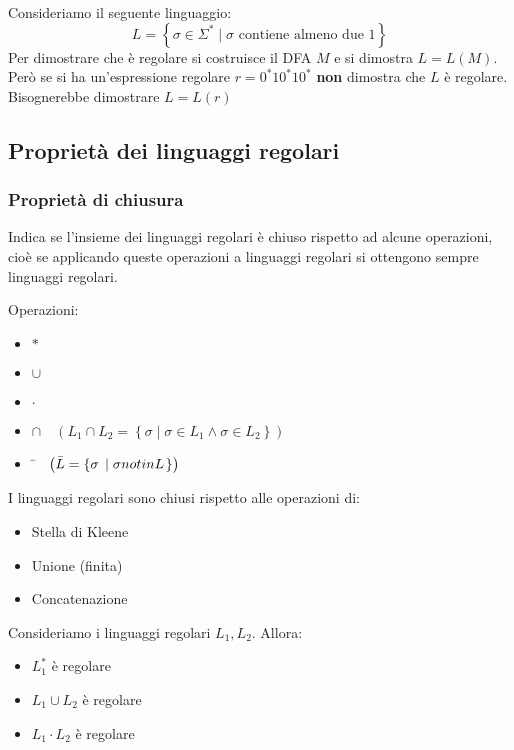 \documentclass[a4paper]{article}
\begin{document}
\begin{example}
  Consideriamo il seguente linguaggio:
  \[
    L = \left\{ \sigma \in \Sigma^* \;\left|\; \sigma \text{ contiene almeno due } 1 \right. \right\}
  \] 
  Per dimostrare che è regolare si costruisce il DFA \( M \) e si dimostra \( L = L(M) \).
  Però se si ha un'espressione regolare \( r = 0^*1 0^*1 0^* \) \textbf{non} dimostra
  che \( L \) è regolare. Bisognerebbe dimostrare \( L = L(r) \) 
\end{example}

\subsection{Proprietà dei linguaggi regolari}

\subsubsection{Proprietà di chiusura}
Indica se l'insieme dei linguaggi regolari è chiuso rispetto ad alcune operazioni,
cioè se applicando queste operazioni a linguaggi regolari si ottengono sempre
linguaggi regolari.

Operazioni:
\begin{itemize}
  \item \( * \) 
  \item \( \cup \) 
  \item \( \cdot  \) 
\item \( \cap \quad \left(L_1 \cap L_2 = \left\{ \sigma \;\left|\; \sigma \in L_1 \wedge \sigma \in L_2 \right. \right\}\right) \)
\item \( \bar{} \quad \left(\bar{L} = \left\{ \sigma \;\left|\; \sigma \\notin L \right. \right\}\right) \)
\end{itemize}

\begin{theorem}
  I linguaggi regolari sono chiusi rispetto alle operazioni di:
  \begin{itemize}
    \item Stella di Kleene
    \item Unione (finita)
    \item Concatenazione
  \end{itemize}
  Consideriamo i linguaggi regolari \( L_1, L_2 \). Allora:
  \begin{itemize}
    \item \( L_1^* \) è regolare
    \item \( L_1 \cup L_2 \) è regolare
    \item \( L_1 \cdot L_2 \) è regolare
  \end{itemize}
\end{theorem}
\end{document}
